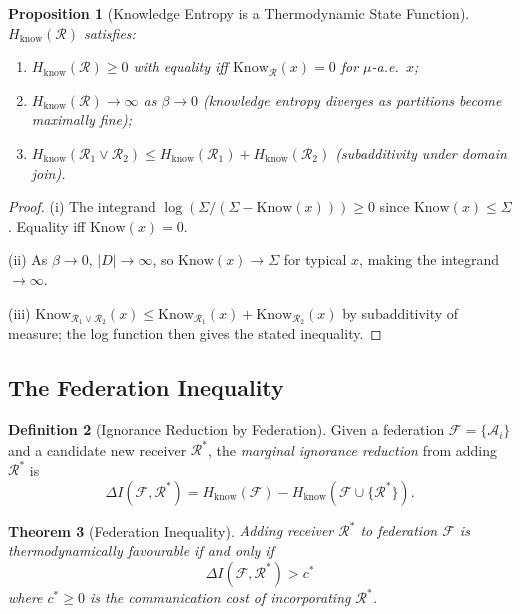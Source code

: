 \documentclass[twocolumn,11pt,a4paper]{article}
\theoremstyle{plain}
\newtheorem{theorem}{Theorem}[section]
\newtheorem{proposition}[theorem]{Proposition}
\theoremstyle{definition}
\newtheorem{definition}[theorem]{Definition}
\theoremstyle{remark}
\newcommand{\abs}[1]{\left|#1\right|}
\begin{document}
\begin{proposition}[Knowledge Entropy is a Thermodynamic State Function]
\label{prop:state_function}
$H_\mathrm{know}(\mathcal{R})$ satisfies:
\begin{enumerate}[label=(\roman*)]
  \item $H_\mathrm{know}(\mathcal{R}) \ge 0$ with equality iff $\mathrm{Know}_\mathcal{R}(x) = 0$ for $\mu$-a.e.\ $x$;
  \item $H_\mathrm{know}(\mathcal{R}) \to \infty$ as $\beta \to 0$ (knowledge entropy diverges as partitions become maximally fine);
  \item $H_\mathrm{know}(\mathcal{R}_1 \vee \mathcal{R}_2) \le H_\mathrm{know}(\mathcal{R}_1) + H_\mathrm{know}(\mathcal{R}_2)$ (subadditivity under domain join).
\end{enumerate}
\end{proposition}

\begin{proof}
(i) The integrand $\log(\Sigma/(\Sigma - \mathrm{Know}(x))) \ge 0$ since $\mathrm{Know}(x) \le \Sigma$.  Equality iff $\mathrm{Know}(x) = 0$.

(ii) As $\beta \to 0$, $\abs{D} \to \infty$, so $\mathrm{Know}(x) \to \Sigma$ for typical $x$, making the integrand $\to \infty$.

(iii) $\mathrm{Know}_{\mathcal{R}_1 \vee \mathcal{R}_2}(x) \le \mathrm{Know}_{\mathcal{R}_1}(x) + \mathrm{Know}_{\mathcal{R}_2}(x)$ by subadditivity of measure; the log function then gives the stated inequality.
\end{proof}

\subsection{The Federation Inequality}

\begin{definition}[Ignorance Reduction by Federation]
\label{def:fed_red}
Given a federation $\mathcal{F} = \{\mathcal{A}_i\}$ and a candidate new receiver $\mathcal{R}^*$, the \emph{marginal ignorance reduction} from adding $\mathcal{R}^*$ is
\begin{equation}
  \Delta I(\mathcal{F}, \mathcal{R}^*) = H_\mathrm{know}(\mathcal{F}) - H_\mathrm{know}(\mathcal{F} \cup \{\mathcal{R}^*\}).
\end{equation}
\end{definition}

\begin{theorem}[Federation Inequality]
\label{thm:federation}
Adding receiver $\mathcal{R}^*$ to federation $\mathcal{F}$ is thermodynamically favourable if and only if
\begin{equation}
  \Delta I(\mathcal{F}, \mathcal{R}^*) > c^*
  \label{eq:federation_ineq}
\end{equation}
where $c^* \ge 0$ is the communication cost of incorporating $\mathcal{R}^*$.
\end{theorem}
\end{document}
